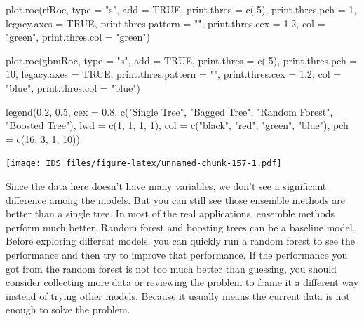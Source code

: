\documentclass[
  12pt,
]{krantz}
\makeatletter
\newenvironment{Shaded}{\begin{snugshade}}{\end{snugshade}}
\newcommand{\AttributeTok}[1]{\textcolor[rgb]{0.61,0.61,0.61}{#1}}
\newcommand{\ConstantTok}[1]{\textcolor[rgb]{0,0,0}{#1}}
\newcommand{\DecValTok}[1]{\textcolor[rgb]{0.06,0.06,0.06}{#1}}
\newcommand{\FloatTok}[1]{\textcolor[rgb]{0.06,0.06,0.06}{#1}}
\newcommand{\FunctionTok}[1]{\textcolor[rgb]{0,0,0}{#1}}
\newcommand{\NormalTok}[1]{#1}
\newcommand{\StringTok}[1]{\textcolor[rgb]{0.5,0.5,0.5}{#1}}
\newenvironment{kframe}{%
\medskip{}
\setlength{\fboxsep}{.8em}
 \def\at@end@of@kframe{}%
 \ifinner\ifhmode%
  \def\at@end@of@kframe{\end{minipage}}%
  \begin{minipage}{\columnwidth}%
 \fi\fi%
 \def\FrameCommand##1{\hskip\@totalleftmargin \hskip-\fboxsep
 \colorbox{shadecolor}{##1}\hskip-\fboxsep
     \hskip-\linewidth \hskip-\@totalleftmargin \hskip\columnwidth}%
 \MakeFramed {\advance\hsize-\width
   \@totalleftmargin\z@ \linewidth\hsize
   \@setminipage}}%
 {\par\unskip\endMakeFramed%
 \at@end@of@kframe}
\renewenvironment{Shaded}{\begin{kframe}}{\end{kframe}}
\makeatother
\begin{document}
\begin{Shaded}
\begin{Highlighting}[]
\FunctionTok{plot.roc}\NormalTok{(rfRoc, }
     \AttributeTok{type =} \StringTok{"s"}\NormalTok{, }
     \AttributeTok{add =} \ConstantTok{TRUE}\NormalTok{, }
     \AttributeTok{print.thres =} \FunctionTok{c}\NormalTok{(.}\DecValTok{5}\NormalTok{), }\AttributeTok{print.thres.pch =} \DecValTok{1}\NormalTok{, }
     \AttributeTok{legacy.axes =} \ConstantTok{TRUE}\NormalTok{, }\AttributeTok{print.thres.pattern =} \StringTok{""}\NormalTok{, }
     \AttributeTok{print.thres.cex =} \FloatTok{1.2}\NormalTok{,}
     \AttributeTok{col =} \StringTok{"green"}\NormalTok{, }\AttributeTok{print.thres.col =} \StringTok{"green"}\NormalTok{)}

\FunctionTok{plot.roc}\NormalTok{(gbmRoc, }
     \AttributeTok{type =} \StringTok{"s"}\NormalTok{, }
     \AttributeTok{add =} \ConstantTok{TRUE}\NormalTok{, }
     \AttributeTok{print.thres =} \FunctionTok{c}\NormalTok{(.}\DecValTok{5}\NormalTok{), }\AttributeTok{print.thres.pch =} \DecValTok{10}\NormalTok{, }
     \AttributeTok{legacy.axes =} \ConstantTok{TRUE}\NormalTok{, }\AttributeTok{print.thres.pattern =} \StringTok{""}\NormalTok{, }
     \AttributeTok{print.thres.cex =} \FloatTok{1.2}\NormalTok{,}
     \AttributeTok{col =} \StringTok{"blue"}\NormalTok{, }\AttributeTok{print.thres.col =} \StringTok{"blue"}\NormalTok{)}

\FunctionTok{legend}\NormalTok{(}\FloatTok{0.2}\NormalTok{, }\FloatTok{0.5}\NormalTok{, }\AttributeTok{cex =} \FloatTok{0.8}\NormalTok{,}
       \FunctionTok{c}\NormalTok{(}\StringTok{"Single Tree"}\NormalTok{, }\StringTok{"Bagged Tree"}\NormalTok{, }
         \StringTok{"Random Forest"}\NormalTok{, }\StringTok{"Boosted Tree"}\NormalTok{),}
       \AttributeTok{lwd =} \FunctionTok{c}\NormalTok{(}\DecValTok{1}\NormalTok{, }\DecValTok{1}\NormalTok{, }\DecValTok{1}\NormalTok{, }\DecValTok{1}\NormalTok{),}
       \AttributeTok{col =} \FunctionTok{c}\NormalTok{(}\StringTok{"black"}\NormalTok{, }\StringTok{"red"}\NormalTok{, }\StringTok{"green"}\NormalTok{, }\StringTok{"blue"}\NormalTok{),}
       \AttributeTok{pch =} \FunctionTok{c}\NormalTok{(}\DecValTok{16}\NormalTok{, }\DecValTok{3}\NormalTok{, }\DecValTok{1}\NormalTok{, }\DecValTok{10}\NormalTok{))}
\end{Highlighting}
\end{Shaded}

\texttt{[image: IDS\_files/figure-latex/unnamed-chunk-157-1.pdf]}

Since the data here doesn't have many variables, we don't see a significant difference among the models. But you can still see those ensemble methods are better than a single tree. In most of the real applications, ensemble methods perform much better. Random forest and boosting trees can be a baseline model. Before exploring different models, you can quickly run a random forest to see the performance and then try to improve that performance. If the performance you got from the random forest is not too much better than guessing, you should consider collecting more data or reviewing the problem to frame it a different way instead of trying other models. Because it usually means the current data is not enough to solve the problem.
\end{document}
